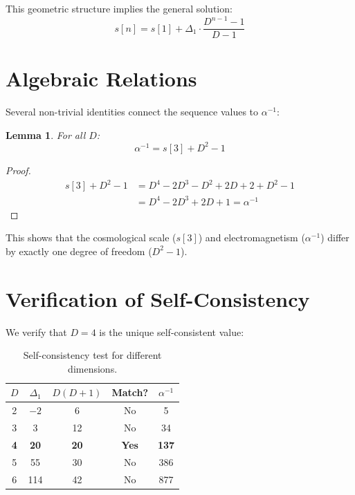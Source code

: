 \documentclass[twocolumn,showpacs,preprintnumbers,amsmath,amssymb,prl]{revtex4-2}
\newtheorem{lemma}[theorem]{Lemma}
\begin{document}
This geometric structure implies the general solution:
\begin{equation}
s[n] = s[1] + \Delta_1 \cdot \frac{D^{n-1} - 1}{D - 1}
\end{equation}

\section{Algebraic Relations}

Several non-trivial identities connect the sequence values to $\alpha^{-1}$:

\begin{lemma}
For all $D$:
\begin{equation}
\alpha^{-1} = s[3] + D^2 - 1
\end{equation}
\end{lemma}

\begin{proof}
\begin{align}
s[3] + D^2 - 1 &= D^4 - 2D^3 - D^2 + 2D + 2 + D^2 - 1 \nonumber\\
&= D^4 - 2D^3 + 2D + 1 = \alpha^{-1}
\end{align}
\end{proof}

This shows that the cosmological scale ($s[3]$) and electromagnetism ($\alpha^{-1}$) differ by exactly one degree of freedom ($D^2 - 1$).

\section{Verification of Self-Consistency}

We verify that $D = 4$ is the unique self-consistent value:

\begin{table}[h]
\centering
\begin{tabular}{ccccc}
\hline
$D$ & $\Delta_1$ & $D(D+1)$ & Match? & $\alpha^{-1}$ \\
\hline
2 & $-2$ & 6 & No & 5 \\
3 & 3 & 12 & No & 34 \\
\textbf{4} & \textbf{20} & \textbf{20} & \textbf{Yes} & \textbf{137} \\
5 & 55 & 30 & No & 386 \\
6 & 114 & 42 & No & 877 \\
\hline
\end{tabular}
\caption{Self-consistency test for different dimensions.}
\label{tab:verify}
\end{table}
\end{document}
